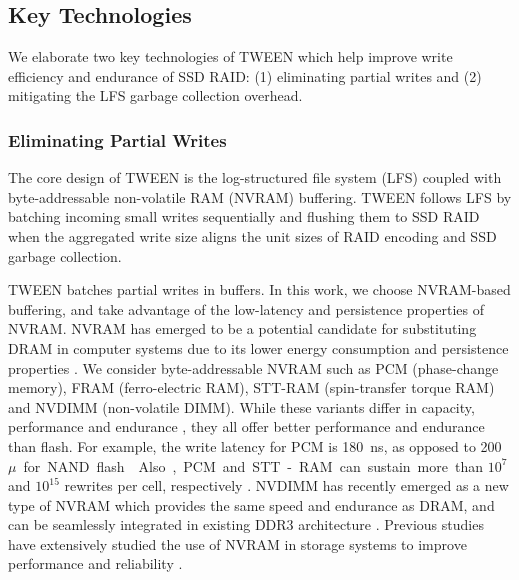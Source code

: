 \subsection{Key Technologies}
\label{subsec:key}

We elaborate two key technologies of TWEEN which help improve write efficiency
and endurance of SSD RAID: (1)
eliminating partial writes and (2) mitigating the LFS garbage collection
overhead. 

\subsubsection{Eliminating Partial Writes}
\label{subsubsec:eliminating}

The core design of TWEEN is the log-structured file system (LFS)
\cite{rosenblum92} coupled with byte-addressable non-volatile RAM (NVRAM) buffering.  
TWEEN follows LFS \cite{rosenblum92} by batching incoming small writes
sequentially and flushing them to SSD RAID when the aggregated write size
aligns the unit sizes of RAID encoding and SSD garbage collection. 


TWEEN batches partial writes in buffers.  In this work, we choose NVRAM-based
buffering, and take advantage of the low-latency and persistence properties of
NVRAM.  NVRAM has emerged to be a potential candidate for substituting DRAM in
computer systems due to its lower energy consumption and persistence
properties \cite{zhou09,lee14}.  We consider byte-addressable NVRAM such as
PCM (phase-change memory), FRAM (ferro-electric RAM), STT-RAM
(spin-transfer torque RAM) and NVDIMM (non-volatile DIMM).  While these variants differ in capacity,
performance and endurance \cite{jung10}, they all offer better performance and
endurance than flash.  For example, the write latency for PCM is
\SI{180}{\nano\second}, as opposed to \SI{200}{$\mu$\second} for NAND flash
\cite{jung10}.  Also, PCM and
STT-RAM can sustain more than $10^7$ and $10^{15}$ rewrites per cell,
respectively \cite{jung10,zhou09}. NVDIMM has recently
emerged as a new type of NVRAM which provides the same speed and endurance as DRAM,
and can be seamlessly integrated in existing DDR3 architecture \cite{viking}.
Previous studies have extensively studied
the use of NVRAM in storage systems to improve performance and reliability
\cite{jung10,venkataraman11,zhou09,qiu13,lee14}.  

